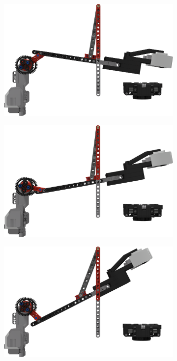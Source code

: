 \documentclass{report}
\begin{document}
\begin{figure}[H]
\begin{subfigure}[b]{0.25\textwidth}
    		\includegraphics[width=\textwidth]{Resources/Images/rdrXMoveArmLowered.png}
    		\caption{}
    		\label{fig:rdrXMoveArmLowered2}
    	\end{subfigure}
    	\begin{subfigure}[b]{0.25\textwidth}
    		\includegraphics[width=\textwidth]{Resources/Images/rdrXMoveArmPostPush.png}
    		\caption{}
    		\label{fig:rdrXMoveArmPostPush}
    	\end{subfigure}
    	\hspace{10mm}
    	\begin{subfigure}[b]{0.25\textwidth}
    		\includegraphics[width=\textwidth]{Resources/Images/rdrXMoveArmRaised.png}

\end{subfigure}
\end{figure}
\end{document}
